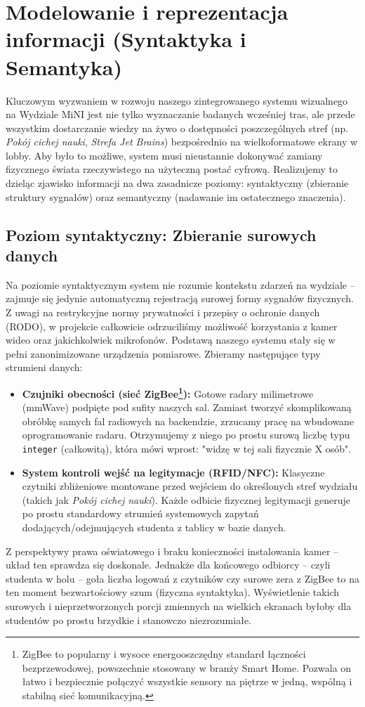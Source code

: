 \documentclass[12pt,a4paper]{article}
\begin{document}
\section{Modelowanie i reprezentacja informacji (Syntaktyka i Semantyka)}

Kluczowym wyzwaniem w rozwoju naszego zintegrowanego systemu wizualnego na Wydziale MiNI jest nie tylko wyznaczanie badanych wcześniej tras, ale przede wszystkim dostarczanie wiedzy na żywo o dostępności poszczególnych stref (np. \textit{Pokój cichej nauki}, \textit{Strefa Jet Brains}) bezpośrednio na wielkoformatowe ekrany w lobby. Aby było to możliwe, system musi nieustannie dokonywać zamiany fizycznego świata rzeczywistego na użyteczną postać cyfrową. Realizujemy to dzieląc zjawisko informacji na dwa zasadnicze poziomy: syntaktyczny (zbieranie struktury sygnałów) oraz semantyczny (nadawanie im ostatecznego znaczenia).

\subsection{Poziom syntaktyczny: Zbieranie surowych danych}

Na poziomie syntaktycznym system nie rozumie kontekstu zdarzeń na wydziale -- zajmuje się jedynie automatyczną rejestracją surowej formy sygnałów fizycznych. Z uwagi na restrykcyjne normy prywatności i przepisy o ochronie danych (RODO), w projekcie całkowicie odrzuciliśmy możliwość korzystania z kamer wideo oraz jakichkolwiek mikrofonów. Podstawą naszego systemu stały się w pełni zanonimizowane urządzenia pomiarowe. Zbieramy następujące typy strumieni danych:
\begin{itemize}
    \item \textbf{Czujniki obecności (sieć ZigBee\footnote{ZigBee to popularny i wysoce energooszczędny standard łączności bezprzewodowej, powszechnie stosowany w branży Smart Home. Pozwala on łatwo i bezpiecznie połączyć wszystkie sensory na piętrze w jedną, wspólną i stabilną sieć komunikacyjną.}):} Gotowe radary milimetrowe (mmWave) podpięte pod sufity naszych sal. Zamiast tworzyć skomplikowaną obróbkę samych fal radiowych na backendzie, zrzucamy pracę na wbudowane oprogramowanie radaru. Otrzymujemy z niego po prostu surową liczbę typu \texttt{integer} (całkowitą), która mówi wprost: "widzę w tej sali fizycznie X osób".
    \item \textbf{System kontroli wejść na legitymacje (RFID/NFC):} Klasyczne czytniki zbliżeniowe montowane przed wejściem do określonych stref wydziału (takich jak \textit{Pokój cichej nauki}). Każde odbicie fizycznej legitymacji generuje po prostu standardowy strumień systemowych zapytań dodających/odejmujących studenta z tablicy w bazie danych.
\end{itemize}
Z perspektywy prawa oświatowego i braku konieczności instalowania kamer – układ ten sprawdza się doskonale. Jednakże dla końcowego odbiorcy – czyli studenta w holu – goła liczba logowań z czytników czy surowe zera z ZigBee to na ten moment bezwartościowy szum (fizyczna syntaktyka). Wyświetlenie takich surowych i nieprzetworzonych porcji zmiennych na wielkich ekranach byłoby dla studentów po prostu brzydkie i stanowczo niezrozumiałe.
\end{document}
